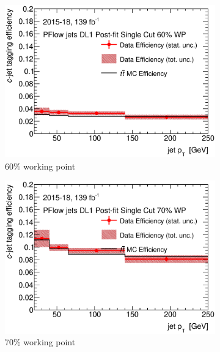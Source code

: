 \documentclass[letterpaper,12pt]{article}
\begin{document}
\newpage

\begin{figure}[H]
	\centering
	\begin{subfigure}[t]{.35\linewidth}
\includegraphics[width=1\textwidth]{FTAG_plots/DL1allPFlowDec/eff60.eps}
\caption{60\% working point}
	\end{subfigure}
\begin{subfigure}[t]{.35\linewidth}
	\includegraphics[width=1\textwidth]{FTAG_plots/DL1allPFlowDec/eff70.eps}
	\caption{70\% working point}
\end{subfigure}
\begin{subfigure}[t]{.35\linewidth}

\end{subfigure}
\end{figure}
\end{document}
